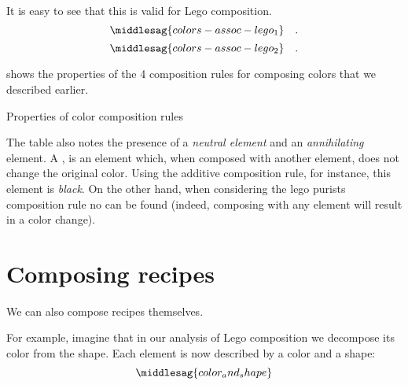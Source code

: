 It is easy to see that this is valid for Lego composition.
\begin{equation}
    \label{eq:colors-assoc-legoa}
    \middlesag{colors-assoc-lego_1}\quad.
\end{equation}
\begin{equation}
    \label{eq:colors-assoc-legob}
    \middlesag{colors-assoc-lego_2}\quad.
\end{equation}

 shows the properties of the 4 composition rules for composing colors that we described earlier.

\begin{table*}[p]
    \caption{Properties of color composition rules}
    \label{tab:color-properties}
\end{table*}

The table also notes the presence of a \emph{neutral element} and an \emph{annihilating} element.
A , is an element which, when composed with another element, does not change the original color.
Using the additive composition rule, for instance, this element is \emph{black}.
On the other hand, when considering the lego purists composition rule no  can be found (indeed, composing with any element will result in a color change).


%

\section{Composing recipes}

We can also compose recipes themselves.

For example, imagine that in our analysis of Lego composition we decompose its color from the shape.
Each element is now described by a color and a shape:
%
\begin{equation}
    \label{eq:color-and-shape}
    \middlesag{color_and_shape}
\end{equation}

